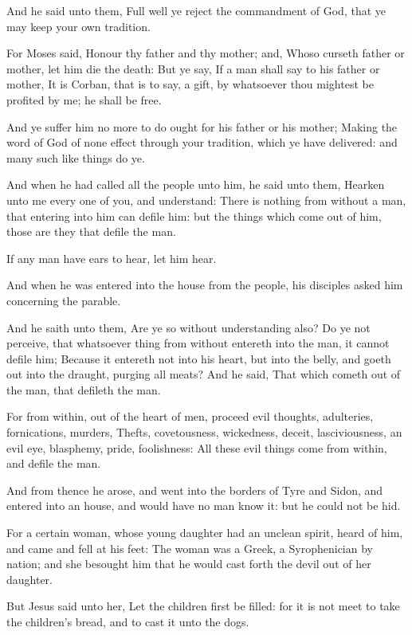\verse And he said unto them, Full well ye reject the commandment of God, that ye may keep your own tradition.

\verse For Moses said, Honour thy father and thy mother; and, Whoso curseth father or mother, let him die the death: \verse But ye say, If a man shall say to his father or mother, It is Corban, that is to say, a gift, by whatsoever thou mightest be profited by me; he shall be free.

\verse And ye suffer him no more to do ought for his father or his mother; \verse Making the word of God of none effect through your tradition, which ye have delivered: and many such like things do ye.

\verse And when he had called all the people unto him, he said unto them, Hearken unto me every one of you, and understand: \verse There is nothing from without a man, that entering into him can defile him: but the things which come out of him, those are they that defile the man.

\verse If any man have ears to hear, let him hear.

\verse And when he was entered into the house from the people, his disciples asked him concerning the parable.

\verse And he saith unto them, Are ye so without understanding also? Do ye not perceive, that whatsoever thing from without entereth into the man, it cannot defile him; \verse Because it entereth not into his heart, but into the belly, and goeth out into the draught, purging all meats?  \verse And he said, That which cometh out of the man, that defileth the man.

\verse For from within, out of the heart of men, proceed evil thoughts, adulteries, fornications, murders, \verse Thefts, covetousness, wickedness, deceit, lasciviousness, an evil eye, blasphemy, pride, foolishness: \verse All these evil things come from within, and defile the man.

\verse And from thence he arose, and went into the borders of Tyre and Sidon, and entered into an house, and would have no man know it: but he could not be hid.

\verse For a certain woman, whose young daughter had an unclean spirit, heard of him, and came and fell at his feet: \verse The woman was a Greek, a Syrophenician by nation; and she besought him that he would cast forth the devil out of her daughter.

\verse But Jesus said unto her, Let the children first be filled: for it is not meet to take the children's bread, and to cast it unto the dogs.

